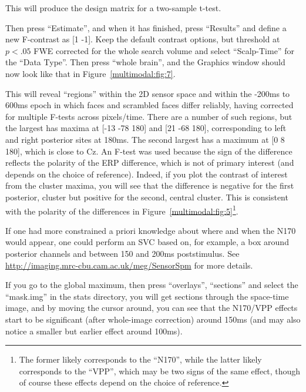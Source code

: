 This will produce the design matrix for a two-sample t-test.

Then press ``Estimate'', and when it has finished, press ``Results'' and define a new F-contrast as [1 -1]. Keep the default contrast options, but threshold at $p<.05$ FWE corrected for the whole search volume and select ``Scalp-Time'' for the ``Data Type''. Then press ``whole brain'', and the Graphics window should now look like that in Figure~\ref{multimodal:fig:7}.

This will reveal ``regions'' within the 2D sensor space and within the -200ms to 600ms epoch in which faces and scrambled faces differ reliably, having corrected for multiple F-tests across pixels/time. There are a number of such regions, but the largest has maxima at [-13 -78 180] and [21 -68 180], corresponding to left and right posterior sites at 180ms. The second largest has a maximum at [0 8 180], which is close to Cz. An F-test was used because the sign of the difference reflects the polarity of the ERP difference, which is not of primary interest (and depends on the choice of reference). Indeed, if you plot the contrast of interest from the cluster maxima, you will see that the difference is negative for the first posterior, cluster but positive for the second, central cluster. This is consistent with the polarity of the differences in Figure~\ref{multimodal:fig:5}\footnote{The former likely corresponds to the ``N170'', while the latter likely corresponds to the ``VPP'', which may be two signs of the same effect, though of course these effects depend on the choice of reference.}.

If one had more constrained a priori knowledge about where and when the N170 would appear, one could perform an SVC based on, for example, a box around posterior channels and between 150 and 200ms poststimulus. See \url{http://imaging.mrc-cbu.cam.ac.uk/meg/SensorSpm} for more details.

If you go to the global maximum, then press ``overlays'', ``sections'' and select the ``mask.img'' in the stats directory, you will get sections through the space-time image, and by moving the cursor around, you can see that the N170/VPP effects start to be significant (after whole-image correction) around 150ms (and may also notice a smaller but earlier effect around 100ms).

